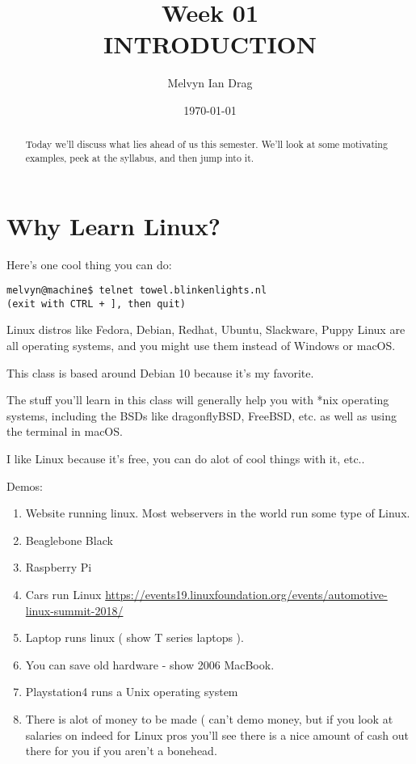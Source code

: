 \documentclass[10pt]{article}
\title{\textbf{Week 01} \\
INTRODUCTION}
\author{
	Melvyn Ian Drag
}
\date{\today}
\begin{document}
\maketitle

\begin{abstract}
Today we'll discuss what lies ahead of us this semester. We'll look at some
motivating examples, peek at the syllabus, and then jump into it.
\end{abstract}

\section{Why Learn Linux?}
Here's one cool thing you can do:

\begin{lstlisting}[style=term]
melvyn@machine$ telnet towel.blinkenlights.nl
(exit with CTRL + ], then quit)
\end{lstlisting}


Linux distros like Fedora, Debian, Redhat, Ubuntu, Slackware, Puppy Linux are
all operating systems, and you might use them instead of Windows or macOS.

This class is based around Debian 10 because it's my favorite.

The stuff you'll learn in this class will generally help you with *nix operating
systems, including the BSDs like dragonflyBSD, FreeBSD, etc. as well as using
the terminal in macOS.

I like Linux because it's free, you can do alot of cool things with it, etc..

Demos:
\begin{enumerate}
\item Website running linux. Most webservers in the world run some type of
Linux.
\item Beaglebone Black
\item Raspberry Pi
\item Cars run Linux
\url{https://events19.linuxfoundation.org/events/automotive-linux-summit-2018/}
\item Laptop runs linux ( show T series laptops ). 
\item You can save old hardware - show 2006 MacBook.
\item Playstation4 runs a Unix operating system
\item There is alot of money to be made ( can't demo money, but if you look at
salaries on indeed for Linux pros you'll see there is a nice amount of cash out
there for you if you aren't a bonehead.
\end{enumerate}
\end{document}
